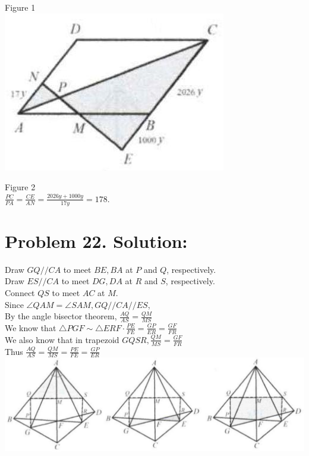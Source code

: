 \documentclass[10pt]{article}
\begin{document}
Figure 1\\
\includegraphics[max width=\textwidth, center]{2025_04_17_97bc1f7e44d93c271a88g-142}

Figure 2\\
\(\frac{P C}{P A}=\frac{C E}{A N}=\frac{2026 y+1000 y}{17 y}=178\).

\section*{Problem 22. Solution:}
Draw \(G Q / / C A\) to meet \(B E, B A\) at \(P\) and \(Q\), respectively.\\
Draw \(E S / / C A\) to meet \(D G, D A\) at \(R\) and \(S\), respectively.\\
Connect \(Q S\) to meet \(A C\) at \(M\).\\
Since \(\angle Q A M=\angle S A M, G Q / / C A / / E S\),\\
By the angle bisector theorem, \(\frac{A Q}{A S}=\frac{Q M}{M S}\)\\
We know that \(\triangle P G F \sim \triangle E R F \cdot \frac{P E}{F E}=\frac{G P}{E R}=\frac{G F}{F R}\)\\
We also know that in trapezoid \(G Q S R, \frac{Q M}{M S}=\frac{G F}{F R}\)\\
Thus \(\frac{A Q}{A S}=\frac{Q M}{M S}=\frac{P E}{F E}=\frac{G P}{E R}\)\\
\includegraphics[max width=\textwidth, center]{2025_04_17_97bc1f7e44d93c271a88g-143}
\end{document}
